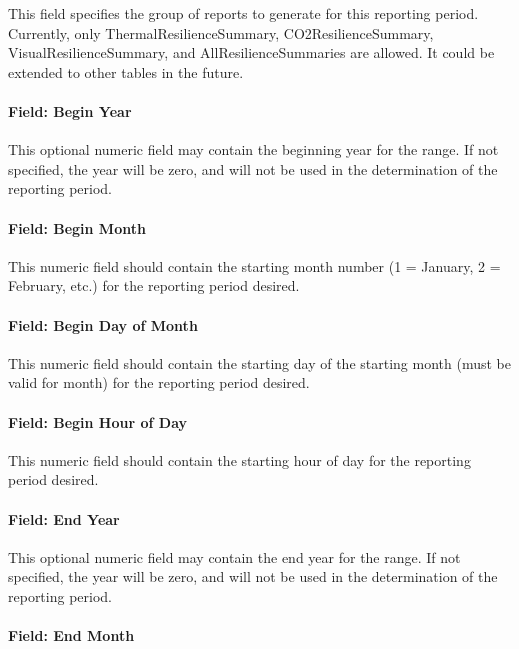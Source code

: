 This field specifies the group of reports to generate for this reporting period.
Currently, only ThermalResilienceSummary, CO2ResilienceSummary,
VisualResilienceSummary, and AllResilienceSummaries are allowed. It could be
extended to other tables in the future.

\paragraph{Field: Begin Year}\label{field-begin-year-2}

This optional numeric field may contain the beginning year for the range. If not
specified, the year will be zero, and will not be used in the determination of the
reporting period.

\paragraph{Field: Begin Month}\label{field-begin-month-3}

This numeric field should contain the starting month number (1 = January, 2 =
February, etc.) for the reporting period desired.

\paragraph{Field: Begin Day of Month}\label{field-begin-day-of-month-3}

This numeric field should contain the starting day of the starting month (must
be valid for month) for the reporting period desired.

\paragraph{Field: Begin Hour of Day}\label{field-begin-hour-of-day}

This numeric field should contain the starting hour of day for the reporting
period desired.

\paragraph{Field: End Year}\label{field-end-year-2}

This optional numeric field may contain the end year for the range. If not
specified, the year will be zero, and will not be used in the determination of the
reporting period.

\paragraph{Field: End Month}\label{field-end-month-3}

